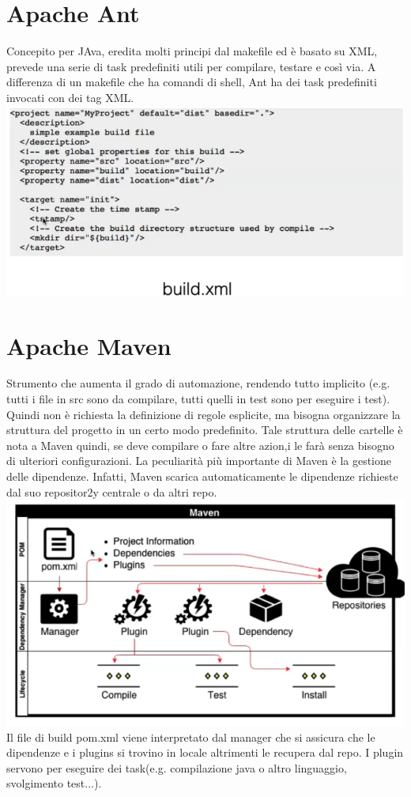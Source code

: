 \documentclass[10pt,a4paper]{book}
\begin{document}
\section{Apache Ant}
Concepito per JAva, eredita molti principi dal makefile ed è basato su XML, prevede una serie di task predefiniti utili per compilare, testare e così via.
A differenza di un makefile che ha comandi di shell, Ant ha dei task predefiniti invocati con dei tag XML.\\
\includegraphics[scale=0.5]{ant.png} \\

\section{Apache Maven}
Strumento che aumenta il grado di automazione, rendendo tutto implicito (e.g. tutti i file in src sono da compilare, tutti quelli in test sono per eseguire i test).
Quindi non è richiesta la definizione di regole esplicite, ma bisogna organizzare la struttura del progetto in un certo modo predefinito. Tale struttura delle cartelle è nota a Maven quindi, se deve compilare o fare altre azion,i le farà senza bisogno di ulteriori configurazioni.
La peculiarità più importante di Maven è la gestione delle dipendenze. Infatti, Maven scarica automaticamente le dipendenze richieste dal suo repositor2y centrale o da altri repo.\\
\includegraphics[scale=0.4]{maven.png} \\
Il file di build pom.xml viene interpretato dal manager che si assicura che le dipendenze e i plugins si trovino in locale altrimenti le recupera dal repo.
I plugin servono per eseguire dei task(e.g. compilazione java o altro linguaggio, svolgimento test...).
\end{document}
